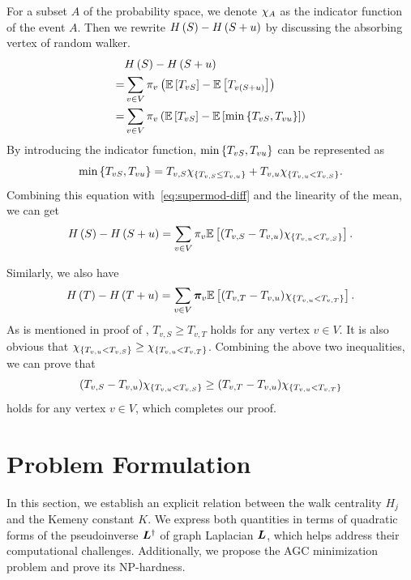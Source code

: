 \documentclass[journal]{IEEEtran}
\begin{document}
\begin{IEEEproof}
    For a subset \(A\) of the probability space, we denote \(\chi_{A}\) as the indicator function of the event \(A\). Then we rewrite \(H\left(S\right)-H\left(S+u\right)\) by discussing the absorbing vertex of random walker.
    \begin{equation}\label{eq:supermod-diff}
        \begin{split}
            &H\left(S\right)-H\left(S+u\right)\\
            =&\sum_{v\in V}\pi_v\left( \mathbb{E}\left[T_{vS}\right]-\mathbb{E}\left[T_{v\left( S+u \right)}\right] \right)\\
            =&\sum_{v\in V}\pi_v\left( \mathbb{E}\left[T_{vS}\right]-\mathbb{E}\left[\min\left\{T_{vS},T_{vu} \right\}\right] \right)
        \end{split}
    \end{equation}
    By introducing the indicator function, \(\min\left\{T_{vS},T_{vu} \right\}\) can be represented as
    \begin{equation*}
        \min\left\{T_{vS},T_{vu} \right\}=T_{v,S}\chi_{\left\{T_{v,S}\le T_{v,u} \right\}}+T_{v,u}\chi_{\left\{T_{v,u}<T_{v,S} \right\}}.
    \end{equation*}
    Combining this equation with~\eqref{eq:supermod-diff} and the linearity of the mean, we can get
    \begin{equation*}
        H\left(S\right)-H\left(S+u\right)=\sum_{v\in V}\pi_v\mathbb{E}\left[(T_{v,S}-T_{v,u})\chi_{\left\{T_{v,u}<T_{v,S} \right\}}\right].
    \end{equation*}

    Similarly, we also have
    \[H\left(T\right)-H\left(T+u\right)=\sum_{v\in V}\boldsymbol{\pi}_v\mathbb{E}\left[(T_{v,T}-T_{v,u})\chi_{\left\{T_{v,u}<T_{v,T} \right\}}\right].\]
    As is mentioned in proof of , \(T_{v,S}\ge T_{v,T}\) holds for any vertex \(v\in V\).
    It is also obvious that \(\chi_{\left\{T_{v,u}<T_{v,S} \right\}}\ge\chi_{\left\{T_{v,u}<T_{v,T} \right\}}\).
    Combining the above two inequalities, we can prove that
    \[(T_{v,S}-T_{v,u})\chi_{\left\{T_{v,u}<T_{v,S} \right\}}\ge(T_{v,T}-T_{v,u})\chi_{\left\{T_{v,u}<T_{v,T} \right\}}\]
    holds for any vertex \(v\in V\), which completes our proof.
\end{IEEEproof}

\section{Problem Formulation}

In this section, we establish an explicit relation between the walk centrality \(H_j\) and the Kemeny constant \(K\).
We express both quantities in terms of quadratic forms of the pseudoinverse \(\boldsymbol{L}^{\dagger}\) of graph Laplacian \(\boldsymbol{L}\), which helps address their computational challenges.
Additionally, we propose the AGC minimization problem and prove its NP-hardness.
\end{document}
